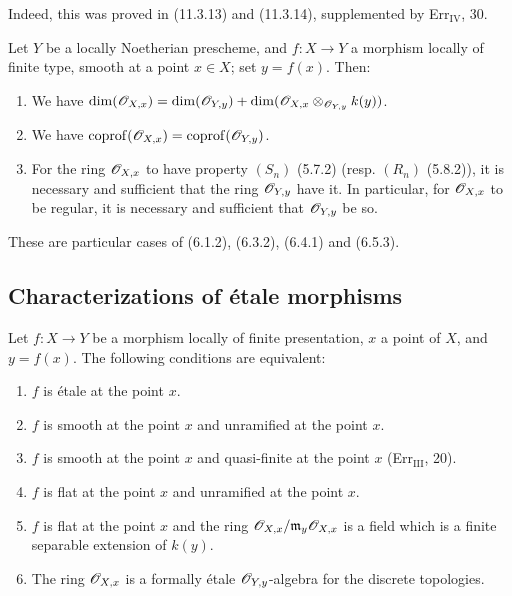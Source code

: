 Indeed, this was proved in (11.3.13) and (11.3.14), supplemented by Err$_{\mathrm{IV}}$, 30.

\begin{proposition}[17.5.8]
\label{IV.17.5.8}
Let $Y$ be a locally Noetherian prescheme, and $f:X\to Y$ a morphism locally of finite type, smooth at a point $x\in X$; set $y=f(x)$. Then:
\begin{enumerate}
  \item[(i)] We have $\dim(\mathscr{O}_{X,x})=\dim(\mathscr{O}_{Y,y})+\dim(\mathscr{O}_{X,x}\otimes_{\mathscr{O}_{Y,y}}k(y))$.
  \item[(ii)] We have $\operatorname{coprof}(\mathscr{O}_{X,x})=\operatorname{coprof}(\mathscr{O}_{Y,y})$.
  \item[(iii)] For the ring $\mathscr{O}_{X,x}$ to have property $(S_n)$ (5.7.2) (resp. $(R_n)$ (5.8.2)), it is necessary and sufficient that the ring $\mathscr{O}_{Y,y}$ have it. In particular, for $\mathscr{O}_{X,x}$ to be regular, it is necessary and sufficient that $\mathscr{O}_{Y,y}$ be so.
\end{enumerate}
\end{proposition}

These are particular cases of (6.1.2), (6.3.2), (6.4.1) and (6.5.3).

\subsection{Characterizations of étale morphisms}

\begin{theorem}[17.6.1]
\label{IV.17.6.1}
Let $f:X\to Y$ be a morphism locally of finite presentation, $x$ a point of $X$, and $y=f(x)$. The following conditions are equivalent:
\begin{enumerate}
  \item[a)] $f$ is étale at the point $x$.
  \item[a')] $f$ is smooth at the point $x$ and unramified at the point $x$.
  \item[b)] $f$ is smooth at the point $x$ and quasi-finite at the point $x$ (Err$_{\mathrm{III}}$, 20).
  \item[c)] $f$ is flat at the point $x$ and unramified at the point $x$.
  \item[c')] $f$ is flat at the point $x$ and the ring $\mathscr{O}_{X,x}/\mathfrak m_y\mathscr{O}_{X,x}$ is a field which is a finite separable extension of $k(y)$.
  \item[d)] The ring $\mathscr{O}_{X,x}$ is a formally étale $\mathscr{O}_{Y,y}$-algebra for the discrete topologies.
\end{enumerate}
\end{theorem}

